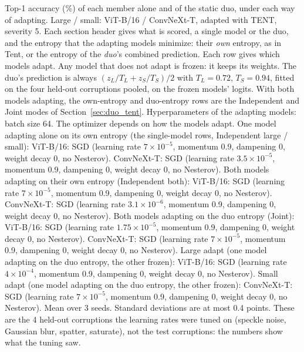 \begin{table}[t]
    \centering
    \small
    \setlength{\tabcolsep}{3.5pt}
    \caption{Top-1 accuracy (\%) of each member alone and of the static duo, under each way of adapting. Large / small: ViT-B/16 / ConvNeXt-T, adapted with TENT, severity 5. Each section header gives what is scored, a single model or the duo, and the entropy that the adapting models minimize: their \emph{own} entropy, as in Tent, or the entropy of the \emph{duo}'s combined prediction. Each row gives which models adapt. Any model that does not adapt is frozen: it keeps its weights. The duo's prediction is always $(z_L / T_L + z_S / T_S) / 2$ with $T_L = 0.72$, $T_S = 0.94$, fitted on the four held-out corruptions pooled, on the frozen models' logits. With both models adapting, the own-entropy and duo-entropy rows are the Independent and Joint modes of Section~\ref{sec:duo_tent}. Hyperparameters of the adapting models: batch size 64. The optimizer depends on how the models adapt. One model adapting alone on its own entropy (the single-model rows, Independent large / small): ViT-B/16: SGD (learning rate $7 \times 10^{-5}$, momentum 0.9, dampening 0, weight decay 0, no Nesterov). ConvNeXt-T: SGD (learning rate $3.5 \times 10^{-5}$, momentum 0.9, dampening 0, weight decay 0, no Nesterov). Both models adapting on their own entropy (Independent both): ViT-B/16: SGD (learning rate $7 \times 10^{-5}$, momentum 0.9, dampening 0, weight decay 0, no Nesterov). ConvNeXt-T: SGD (learning rate $3.1 \times 10^{-6}$, momentum 0.9, dampening 0, weight decay 0, no Nesterov). Both models adapting on the duo entropy (Joint): ViT-B/16: SGD (learning rate $1.75 \times 10^{-5}$, momentum 0.9, dampening 0, weight decay 0, no Nesterov). ConvNeXt-T: SGD (learning rate $7 \times 10^{-5}$, momentum 0.9, dampening 0, weight decay 0, no Nesterov). Large adapt (one model adapting on the duo entropy, the other frozen): ViT-B/16: SGD (learning rate $4 \times 10^{-4}$, momentum 0.9, dampening 0, weight decay 0, no Nesterov). Small adapt (one model adapting on the duo entropy, the other frozen): ConvNeXt-T: SGD (learning rate $7 \times 10^{-5}$, momentum 0.9, dampening 0, weight decay 0, no Nesterov). Mean over 3 seeds. Standard deviations are at most 0.4 points. These are the 4 held-out corruptions the learning rates were tuned on (speckle noise, Gaussian blur, spatter, saturate), not the test corruptions: the numbers show what the tuning saw.}

\end{table}
